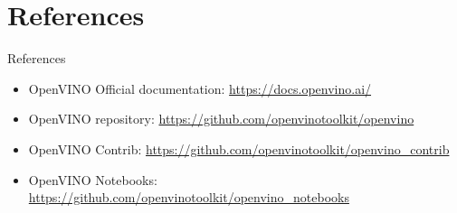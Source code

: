 \documentclass{beamer}
\begin{document}
\section{References}
\begin{frame}{References}
  \begin{itemize}
    \item OpenVINO Official documentation: \href{https://docs.openvino.ai/}{https://docs.openvino.ai/}
    \item OpenVINO repository: \href{https://github.com/openvinotoolkit/openvino}{https://github.com/openvinotoolkit/openvino}
    \item OpenVINO Contrib: \href{https://github.com/openvinotoolkit/openvino_contrib}{https://github.com/openvinotoolkit/openvino\_contrib}
    \item OpenVINO Notebooks: \href{https://github.com/openvinotoolkit/openvino_notebooks}{https://github.com/openvinotoolkit/openvino\_notebooks}
  \end{itemize}
\end{frame}
\end{document}
